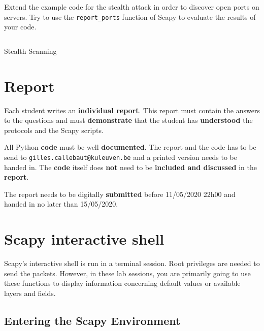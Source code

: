 \documentclass[11pt,a4paper]{article}
\begin{document}
\begin{question}
Extend the example code for the stealth attack in order to discover open ports on servers.
Try to use the \texttt{report\_ports} function of Scapy to evaluate the results of your code.
\end{question}


\begin{listing}[h]
\inputminted{python}{../code_students/stealth_scanning.py}
\caption{Stealth Scanning}%
\label{listing:stealth-scanning}
\end{listing}


\FloatBarrier
\section{Report}
Each student writes an \textbf{individual report}. 
This report must contain the answers to the questions and must \textbf{demonstrate} that the student has \textbf{understood} the protocols and the Scapy scripts. 

All Python \textbf{code} must be well \textbf{documented}.
The report and the code has to be send to \texttt{gilles.callebaut@kuleuven.be} and a printed version needs to be handed in. The \textbf{code} itself does \textbf{not} need to be \textbf{included and discussed} in the \textbf{report}.


The report needs to be digitally \textbf{submitted} before 11/05/2020 22h00 and handed in no later than 15/05/2020.






\clearpage
\appendix
\section{Scapy interactive shell}\label{sec:scapy-interactive}

Scapy's interactive shell is run in a terminal session. Root privileges are needed to send the packets. However, in these lab sessions, you are primarily going to use these functions to display information concerning default values or available layers and fields.

\subsection{Entering the Scapy Environment}
\end{document}
